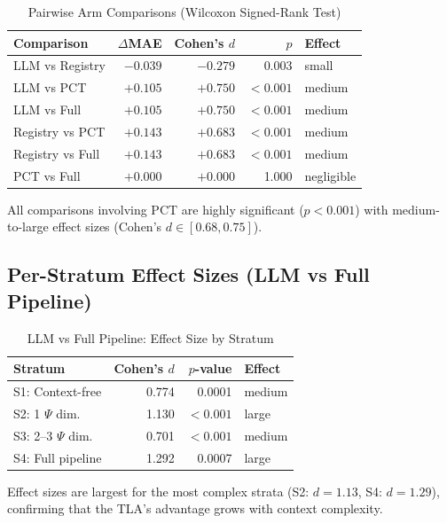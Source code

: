 \begin{table}[htbp]
\centering
\caption{Pairwise Arm Comparisons (Wilcoxon Signed-Rank Test)}
\label{tab:tla-pairwise}
\begin{tabular}{lrrrl}
\toprule
\textbf{Comparison} & \textbf{$\Delta$MAE} & \textbf{Cohen's $d$} & \textbf{$p$} & \textbf{Effect} \\
\midrule
LLM vs Registry     & $-0.039$ & $-0.279$ & 0.003  & small \\
LLM vs PCT          & $+0.105$ & $+0.750$ & $<0.001$ & medium \\
LLM vs Full         & $+0.105$ & $+0.750$ & $<0.001$ & medium \\
Registry vs PCT     & $+0.143$ & $+0.683$ & $<0.001$ & medium \\
Registry vs Full    & $+0.143$ & $+0.683$ & $<0.001$ & medium \\
PCT vs Full         & $+0.000$ & $+0.000$ & 1.000  & negligible \\
\bottomrule
\end{tabular}
\end{table}

All comparisons involving PCT are highly significant ($p < 0.001$) with
medium-to-large effect sizes (Cohen's $d \in [0.68, 0.75]$).

\subsection{Per-Stratum Effect Sizes (LLM vs Full Pipeline)}

\begin{table}[htbp]
\centering
\caption{LLM vs Full Pipeline: Effect Size by Stratum}
\label{tab:tla-effect-stratum}
\begin{tabular}{lrrl}
\toprule
\textbf{Stratum} & \textbf{Cohen's $d$} & \textbf{$p$-value} & \textbf{Effect} \\
\midrule
S1: Context-free      & 0.774 & 0.0001  & medium \\
S2: 1 $\Psi$ dim.     & 1.130 & $<0.001$ & large \\
S3: 2--3 $\Psi$ dim.  & 0.701 & $<0.001$ & medium \\
S4: Full pipeline      & 1.292 & 0.0007  & large \\
\bottomrule
\end{tabular}
\end{table}

Effect sizes are largest for the most complex strata (S2: $d = 1.13$,
S4: $d = 1.29$), confirming that the TLA's advantage grows with context
complexity.

